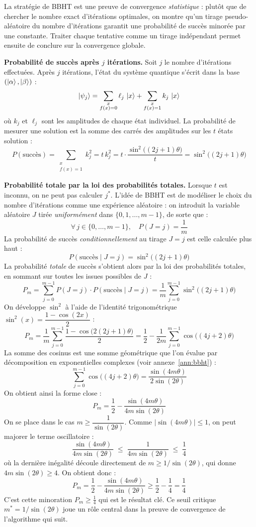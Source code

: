 \documentclass{ceri/sty/rapport}
\begin{document}
La stratégie de BBHT est une preuve de convergence \emph{statistique} : plutôt que de chercher le nombre exact d'itérations optimales, on montre qu'un tirage pseudo-aléatoire du nombre d'itérations garantit une probabilité de succès minorée par une constante. Traiter chaque tentative comme un tirage indépendant permet ensuite de conclure sur la convergence globale.

\medskip\noindent\textbf{Probabilité de succès après $j$ itérations.}
Soit $j$ le nombre d'itérations effectuées. Après $j$ itérations, l'état du système quantique s'écrit dans la base $(\ket{\alpha}, \ket{\beta})$ :
\[
\ket{\psi_j}
= \sum_{\substack{x \\ f(x)=0}} \ell_j\,\ket{x}
+ \sum_{\substack{x \\ f(x)=1}} k_j\,\ket{x}
\]
où $k_j$ et $\ell_j$ sont les amplitudes de chaque état individuel. La probabilité de mesurer une solution est la somme des carrés des amplitudes sur les $t$ états solution :
\[
P(\text{succès}) = \sum_{\substack{x \\ f(x)=1}} k_j^2 = t\,k_j^2 = t \cdot \frac{\sin^2\!\bigl((2j+1)\theta\bigr)}{t} = \sin^2\!\bigl((2j+1)\theta\bigr)
\]

\medskip\noindent\textbf{Probabilité totale par la loi des probabilités totales.}
Lorsque $t$ est inconnu, on ne peut pas calculer $j^*$. L'idée de BBHT est de modéliser le choix du nombre d'itérations comme une expérience aléatoire : on introduit la variable aléatoire $J$ tirée \emph{uniformément} dans $\{0, 1, \ldots, m-1\}$, de sorte que :
\[
\forall\, j \in \{0,\ldots,m-1\},\quad P(J = j) = \frac{1}{m}
\]
La probabilité de succès \emph{conditionnellement} au tirage $J = j$ est celle calculée plus haut :
\[
P(\text{succès} \mid J = j) = \sin^2\!\bigl((2j+1)\theta\bigr)
\]
La probabilité \emph{totale} de succès s'obtient alors par la loi des probabilités totales, en sommant sur toutes les issues possibles de $J$ :
\[
P_m
= \sum_{j=0}^{m-1} P(J = j)\cdot P(\text{succès} \mid J = j)
= \frac{1}{m}\sum_{j=0}^{m-1} \sin^2\!\bigl((2j+1)\theta\bigr)
\]
On développe $\sin^2$ à l'aide de l'identité trigonométrique $\sin^2(x) = \dfrac{1 - \cos(2x)}{2}$ :
\[
P_m
= \frac{1}{m}\sum_{j=0}^{m-1} \frac{1 - \cos\!\bigl(2(2j+1)\theta\bigr)}{2}
= \frac{1}{2} - \frac{1}{2m}\sum_{j=0}^{m-1}\cos\!\bigl((4j+2)\theta\bigr)
\]
La somme des cosinus est une somme géométrique que l'on évalue par décomposition en exponentielles complexes (voir annexe~\ref{ann:bbht}) :
\[
\sum_{j=0}^{m-1}\cos\!\bigl((4j+2)\theta\bigr) = \frac{\sin(4m\theta)}{2\sin(2\theta)}
\]
On obtient ainsi la forme close :
\[
\boxed{P_m = \frac{1}{2} - \frac{\sin(4m\theta)}{4m\sin(2\theta)}}
\]
On se place dans le cas $m \ge \dfrac{1}{\sin(2\theta)}$. Comme $|\sin(4m\theta)| \le 1$, on peut majorer le terme oscillatoire :
\[
\frac{\sin(4m\theta)}{4m\sin(2\theta)}
\;\le\;
\frac{1}{4m\sin(2\theta)}
\;\le\;
\frac{1}{4}
\]
où la dernière inégalité découle directement de $m \ge 1/\sin(2\theta)$, qui donne $4m\sin(2\theta) \ge 4$. On obtient donc :
\[
P_m = \frac{1}{2} - \frac{\sin(4m\theta)}{4m\sin(2\theta)} \ge \frac{1}{2} - \frac{1}{4} = \frac{1}{4}
\]
C'est cette minoration $P_m \ge \frac{1}{4}$ qui est le résultat clé. Ce seuil critique $m^* = 1/\sin(2\theta)$ joue un rôle central dans la preuve de convergence de l'algorithme qui suit.
\end{document}

